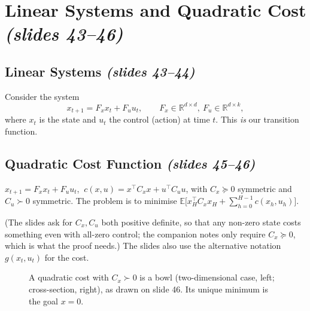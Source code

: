 \documentclass[11pt,a4paper]{article}
\newcommand{\E}{\mathbb{E}}
\newcommand{\R}{\mathbb{R}}
\newcommand{\slides}[1]{\emph{(slides #1)}}
\theoremstyle{plain}
\theoremstyle{definition}
\theoremstyle{remark}
\begin{document}
\section{Linear Systems and Quadratic Cost \slides{43--46}}

\subsection{Linear Systems \slides{43--44}}

Consider the system
\[
x_{t+1}=F_x x_t+F_u u_t,\qquad F_x\in\R^{d\times d},\ F_u\in\R^{d\times k},
\]
where $x_t$ is the state and $u_t$ the control (action) at time $t$. This \emph{is} our transition function.

\subsection{Quadratic Cost Function \slides{45--46}}

\begin{definition}\label{def:lqr}
$x_{t+1}=F_xx_t+F_uu_t$, $\ c(x,u)=x^\top C_xx+u^\top C_uu$, with $C_x\succeq0$ symmetric and $C_u\succ0$ symmetric. The problem is to minimise $\E\big[x_H^\top C_xx_H+\sum_{h=0}^{H-1}c(x_h,u_h)\big]$.
\end{definition}

(The slides ask for $C_x,C_u$ both positive definite, so that any non-zero state costs something even with all-zero control; the companion notes only require $C_x\succeq0$, which is what the proof needs.) The slides also use the alternative notation $g(x_t,u_t)$ for the cost.

\begin{figure}[H]
\centering
\begin{minipage}{0.48\linewidth}
\centering
{}
\end{minipage}\hfill
\begin{minipage}{0.48\linewidth}
\centering
{}
\end{minipage}
\caption{A quadratic cost with $C_x\succ0$ is a bowl (two-dimensional case, left; cross-section, right), as drawn on slide 46. Its unique minimum is the goal $x=0$.}
\end{figure}
\end{document}
